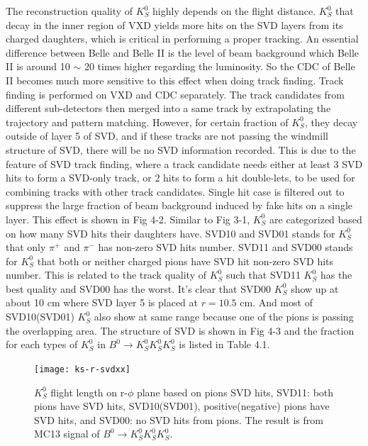 The reconstruction quality of $K_S^0$ highly depends on the flight distance. $K_S^0$ that decay in the inner region of VXD yields more hits on the SVD layers from its charged daughters, which is critical in performing a proper tracking. An essential difference between Belle and Belle II is the level of beam background which Belle II is around 10 $\sim$ 20 times higher regarding the luminosity. So the CDC of Belle II becomes much more sensitive to this effect when doing track finding. Track finding is performed on VXD and CDC separately. The track candidates from different sub-detectors then merged into a same track by extrapolating the trajectory and pattern matching. However, for certain fraction of $K_S^0$, they decay outside of layer 5 of SVD, and if these tracks are not passing the windmill structure of SVD, there will be no SVD information recorded. This is due to the feature of SVD track finding, where a track candidate needs either at least 3 SVD hits to form a SVD-only track, or 2 hits to form a hit double-lets, to be used for combining tracks with other track candidates. Single hit case is filtered out to suppress the large fraction of beam background induced by fake hits on a single layer. This effect is shown in Fig 4-2. Similar to Fig 3-1, $K_S^0$ are categorized based on how many SVD hits their daughters have. SVD10 and SVD01 stands for $K_S^0$ that only $\pi^+$ and $\pi^-$ has non-zero SVD hits number. SVD11 and SVD00 stands for $K_S^0$ that both or neither charged pions have SVD hit non-zero SVD hits number. This is related to the track quality of $K_S^0$ such that SVD11 $K_S^0$ has the best quality and SVD00 has the worst. It's clear that SVD00 $K_S^0$ show up at about 10 cm where SVD layer 5 is placed at $r=10.5$ cm. And most of SVD10(SVD01) $K_S^0$ also show at same range because one of the pions is passing the overlapping area. The structure of SVD is shown in Fig 4-3 and the fraction for each types of $K_S^0$ in $B^0 \to K_S^0  K_S^0  K_S^0$ is listed in Table 4.1.
\begin{figure}[htpb]
	\centering
	\texttt{[image: ks-r-svdxx]}
	\caption{$K_S^0$ flight length on r-$\phi$ plane based on pions SVD hits, SVD11: both pions have SVD hits, SVD10(SVD01), positive(negative) pions have SVD hits, and SVD00: no SVD hits from pions. The result is from MC13 signal of $B^0 \to K_S^0  K_S^0  K_S^0$.}
	\label{fig:ks-r-svdxx}
\end{figure}

